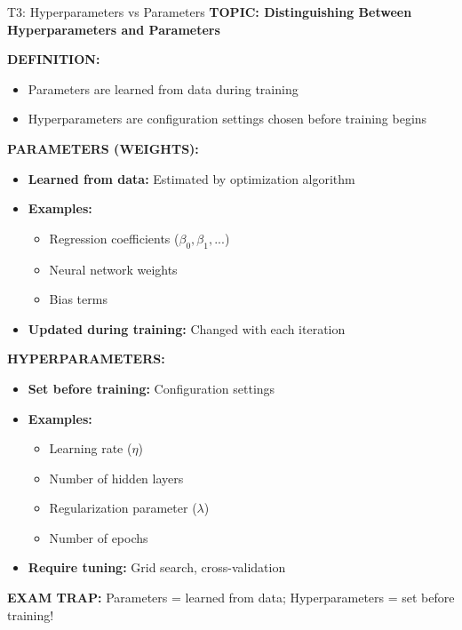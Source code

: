 \documentclass[8pt]{beamer}
\begin{document}
	\begin{frame}{T3: Hyperparameters vs Parameters}
		\fontsize{6.5}{7.5}\selectfont
		\textbf{TOPIC: Distinguishing Between Hyperparameters and Parameters}
		
		\vspace{0.1cm}
		\textbf{DEFINITION:}
		\begin{itemize}
			\item Parameters are learned from data during training
			\item Hyperparameters are configuration settings chosen before training begins
		\end{itemize}
		
		\vspace{0.1cm}
		\textbf{PARAMETERS (WEIGHTS):}
		\begin{itemize}
			\item \textbf{Learned from data:} Estimated by optimization algorithm
			\item \textbf{Examples:}
			\begin{itemize}
				\item Regression coefficients ($\beta_0, \beta_1, ...$)
				\item Neural network weights
				\item Bias terms
			\end{itemize}
			\item \textbf{Updated during training:} Changed with each iteration
		\end{itemize}
		
		\vspace{0.1cm}
		\textbf{HYPERPARAMETERS:}
		\begin{itemize}
			\item \textbf{Set before training:} Configuration settings
			\item \textbf{Examples:}
			\begin{itemize}
				\item Learning rate ($\eta$)
				\item Number of hidden layers
				\item Regularization parameter ($\lambda$)
				\item Number of epochs
			\end{itemize}
			\item \textbf{Require tuning:} Grid search, cross-validation
		\end{itemize}
		
		\textcolor{myred}{\textbf{EXAM TRAP:}} Parameters = \textcolor{myblue}{learned from data}; Hyperparameters = \textcolor{myblue}{set before training}!
	\end{frame}
	
\end{document}
